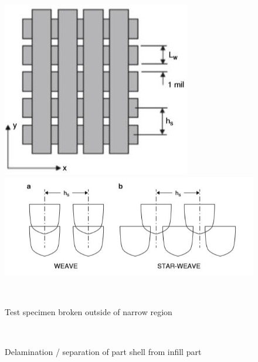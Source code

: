 \documentclass[a4paper, twoside, 11pt]{report}
\begin{document}
\begin{figure}[!t]
  \centering
  \begin{minipage}[b]{0.45\textwidth}
    \includegraphics[width=\textwidth]{weave1}
  \end{minipage}
  \hfill
  \begin{minipage}[b]{0.45\textwidth}
    \includegraphics[width=\textwidth]{weave2}
  \end{minipage}
  \\[1pt]
  \begin{minipage}[t]{0.45\textwidth}
    \caption{Test specimen broken outside of narrow region}
  \end{minipage}
  \hfill
  \begin{minipage}[t]{0.45\textwidth}
    \caption{Delamination / separation of part shell from infill part}
  \end{minipage}
  \\[5pt]

\end{figure}
\end{document}
